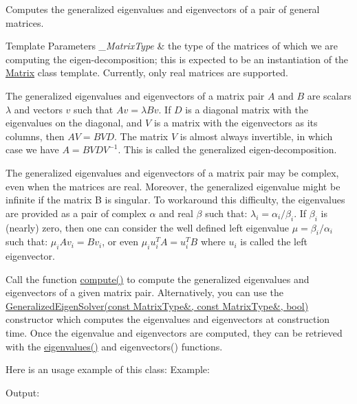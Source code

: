 Computes the generalized eigenvalues and eigenvectors of a pair of general matrices. 


\begin{DoxyTemplParams}{Template Parameters}
{\em \+\_\+\+Matrix\+Type} & the type of the matrices of which we are computing the eigen-\/decomposition; this is expected to be an instantiation of the \hyperlink{group___core___module_class_eigen_1_1_matrix}{Matrix} class template. Currently, only real matrices are supported.\\
\hline
\end{DoxyTemplParams}
The generalized eigenvalues and eigenvectors of a matrix pair $ A $ and $ B $ are scalars $ \lambda $ and vectors $ v $ such that $ Av = \lambda Bv $. If $ D $ is a diagonal matrix with the eigenvalues on the diagonal, and $ V $ is a matrix with the eigenvectors as its columns, then $ A V = B V D $. The matrix $ V $ is almost always invertible, in which case we have $ A = B V D V^{-1} $. This is called the generalized eigen-\/decomposition.

The generalized eigenvalues and eigenvectors of a matrix pair may be complex, even when the matrices are real. Moreover, the generalized eigenvalue might be infinite if the matrix B is singular. To workaround this difficulty, the eigenvalues are provided as a pair of complex $ \alpha $ and real $ \beta $ such that\+: $ \lambda_i = \alpha_i / \beta_i $. If $ \beta_i $ is (nearly) zero, then one can consider the well defined left eigenvalue $ \mu = \beta_i / \alpha_i$ such that\+: $ \mu_i A v_i = B v_i $, or even $ \mu_i u_i^T A = u_i^T B $ where $ u_i $ is called the left eigenvector.

Call the function \hyperlink{group___eigenvalues___module_a275910b47dfe5f40211dcb59cfd68f3c}{compute()} to compute the generalized eigenvalues and eigenvectors of a given matrix pair. Alternatively, you can use the \hyperlink{group___eigenvalues___module_a2a3528cbf75f66d3a60af9dc7b12ff65}{Generalized\+Eigen\+Solver(const Matrix\+Type\&, const Matrix\+Type\&, bool)} constructor which computes the eigenvalues and eigenvectors at construction time. Once the eigenvalue and eigenvectors are computed, they can be retrieved with the \hyperlink{group___eigenvalues___module_a62f01cd78271efd5e39bcb24e0fe1a58}{eigenvalues()} and eigenvectors() functions.

Here is an usage example of this class\+: Example\+: 
\begin{DoxyCodeInclude}
\end{DoxyCodeInclude}
 Output\+: 
\begin{DoxyVerbInclude}
\end{DoxyVerbInclude}


